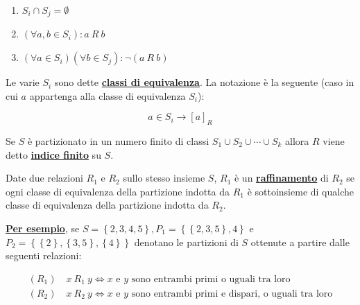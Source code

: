 \documentclass[a4paper]{article}
\begin{document}
	\begin{enumerate}[label=\Roman*]
		\item $S_{i} \cap S_{j} = \emptyset$
		
		\item $\left(\forall a, b \in S_{i}\right): a \: R \: b$
		
		\item $\left(\forall a \in S_{i}\right)\left(\forall b \in S_{j}\right): \lnot \left(a \: R \: b\right)$
	\end{enumerate}
	
	\noindent
	Le varie $S_{i}$ sono dette \textcolor{Red3}{\textbf{\underline{classi di equivalenza}}}. La notazione è la seguente (caso in cui $a$ appartenga alla classe di equivalenza $S_{i}$):
	
	\begin{equation*}
		a \in S_{i} \longrightarrow \left[a\right]_{R}
	\end{equation*}\newline

	\noindent
	Se $S$ è partizionato in un numero finito di classi $S_{1} \cup S_{2} \cup \cdots \cup S_{k}$ allora $R$ viene detto \textcolor{Red3}{\textbf{\underline{indice finito}}} su $S$.\newline
	
	\noindent
	Date due relazioni $R_{1}$ e $R_{2}$ sullo stesso insieme $S$, $R_{1}$ è un \textcolor{Red3}{\textbf{\underline{raffinamento}}} di $R_{2}$ se ogni classe di equivalenza della partizione indotta da $R_{1}$ è sottoinsieme di qualche classe di equivalenza della partizione indotta da $R_{2}$.\newline
	
	\noindent
	\textcolor{Green4}{\textbf{\underline{Per esempio}}}, se $S = \left\{2, 3, 4, 5\right\}, P_{1} = \left\{\left\{2, 3, 5\right\}, 4\right\}$ e $P_{2} = \left\{\left\{2\right\}, \left\{3, 5\right\}, \left\{4\right\}\right\}$ denotano le partizioni di $S$ ottenute a partire dalle seguenti relazioni:
	
	\begin{gather*}
		\left(R_{1}\right) \hspace{1em} x \: R_{1} \: y \iff x \text{ e } y \text{ sono entrambi primi o uguali tra loro} \\
		\left(R_{2}\right) \hspace{1em} x \: R_{2} \: y \iff x \text{ e } y \text{ sono entrambi primi e dispari, o uguali tra loro}
	\end{gather*}
\end{document}
